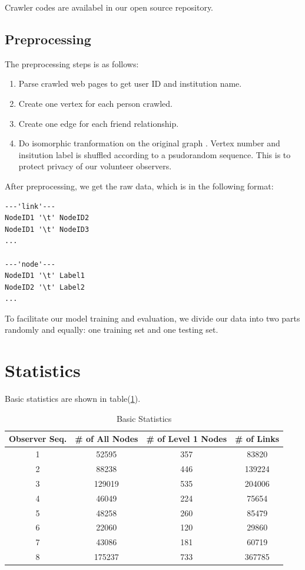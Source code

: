 \documentclass[11pt,a4paper]{article}
\begin{document}
Crawler codes are availabel in our open source repository. 

\subsection{Preprocessing}

The preprocessing steps is as follows:
\begin{enumerate}
	\item Parse crawled web pages to get user ID and institution name. 
	\item Create one vertex for each person crawled. 
	\item Create one edge for each friend relationship. 
	\item Do isomorphic tranformation on the original graph
	\cite{wiki_iso_graph}. Vertex number and insitution label 
	is shuffled according to a psudorandom sequence. 
	This is to protect privacy of our volunteer observers. 
\end{enumerate}

After preprocessing, we get the raw data, which is in the
following format:
\begin{Verbatim}
---'link'---
NodeID1 '\t' NodeID2
NodeID1 '\t' NodeID3
...

---'node'---
NodeID1 '\t' Label1
NodeID2 '\t' Label2
...
\end{Verbatim}

To facilitate our model training and evaluation, 
we divide our data into two parts randomly and equally: 
one training set and one testing set. 

\section{Statistics}

Basic statistics are shown in table(\ref{tbl:stat_basic}). 

\begin{table}[htb]
\caption{Basic Statistics}
\label{tbl:stat_basic}
\begin{tabular}{c|ccc}
\hline
Observer Seq. & \# of All Nodes & \# of Level 1 Nodes & \# of Links \\
\hline
1 & 52595 & 357 & 83820 \\
2 & 88238 & 446 & 139224 \\
3 & 129019 & 535 & 204006 \\
4 & 46049 & 224 & 75654 \\
5 & 48258 & 260 & 85479 \\
6 & 22060 & 120 & 29860 \\
7 & 43086 & 181 & 60719 \\
8 & 175237 & 733 & 367785 \\
\hline
\end{tabular}
\end{table}
\end{document}
